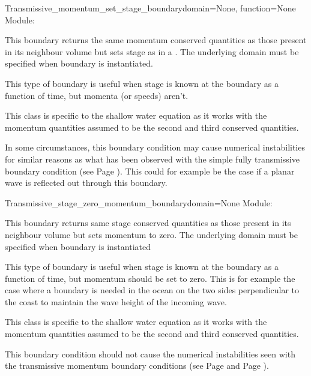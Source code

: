 \documentclass{manual}
\begin{document}
\begin{classdesc}{Transmissive_momentum_set_stage_boundary}{domain=None,
                                                            function=None}
Module: 
\label{pg: transmissive momentum set stage boundary}

This boundary returns the same momentum conserved quantities as
those present in its neighbour volume but sets stage as in a .
The underlying domain must be specified when boundary is instantiated.

This type of boundary is useful when stage is known at the boundary as a
function of time, but momenta (or speeds) aren't.

This class is specific to the shallow water equation as it works with the
momentum quantities assumed to be the second and third conserved quantities.

In some circumstances, this boundary condition may cause numerical instabilities for similar
reasons as what has been observed with the simple fully transmissive boundary condition
(see Page \pageref{pg: transmissive boundary}).
This could for example be the case if a planar wave is reflected out through this boundary.
\end{classdesc}

\begin{classdesc}{Transmissive_stage_zero_momentum_boundary}{domain=None}
Module: 
\label{pg: transmissive stage zero momentum boundary}

This boundary returns same stage conserved quantities as
those present in its neighbour volume but sets momentum to zero.
The underlying domain must be specified when boundary is instantiated

This type of boundary is useful when stage is known at the boundary as a
function of time, but momentum should be set to zero. This is for example
the case where a boundary is needed in the ocean on the two sides perpendicular
to the coast to maintain the wave height of the incoming wave.

This class is specific to the shallow water equation as it works with the
momentum quantities assumed to be the second and third conserved quantities.

This boundary condition should not cause the numerical instabilities seen with the transmissive momentum
boundary conditions (see Page \pageref{pg: transmissive boundary} and
Page \pageref{pg: transmissive momentum set stage boundary}).
\end{classdesc}
\end{document}
